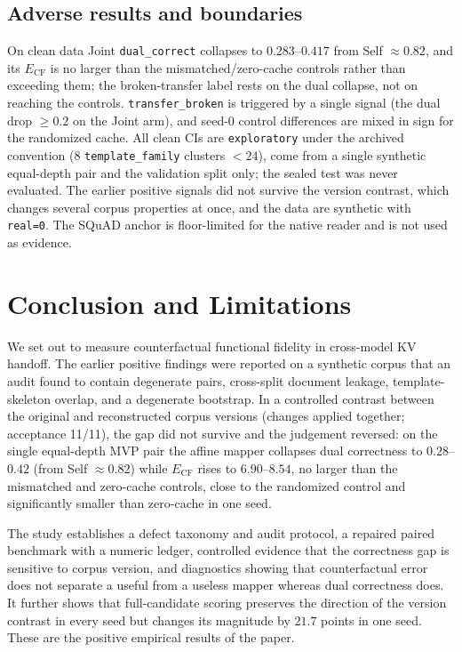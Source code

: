 \documentclass[11pt,a4paper]{article}
\begin{document}
\subsection{Adverse results and boundaries}
\label{sec:adverse}

On clean data Joint \texttt{dual\_correct} collapses to $0.283$--$0.417$ from
Self $\approx0.82$, and its $E_{\mathrm{CF}}$ is no larger than the
mismatched/zero-cache controls rather than exceeding them; the broken-transfer
label rests on the dual collapse, not on reaching the controls.
\texttt{transfer\_broken} is triggered by a single signal (the dual drop
$\ge0.2$ on the Joint arm), and seed-0 control differences are mixed in sign
for the randomized cache. All clean CIs are \texttt{exploratory} under the
archived convention (8 \texttt{template\_family} clusters $<24$), come from a
single synthetic equal-depth pair and the validation split only; the sealed
test was never evaluated. The earlier positive signals did not survive the
version contrast, which changes several corpus properties at once, and the
data are synthetic with \texttt{real=0}. The SQuAD anchor is floor-limited for
the native reader and is not used as evidence.

\section{Conclusion and Limitations}
\label{sec:conclusion}

We set out to measure counterfactual functional fidelity in cross-model KV
handoff. The earlier positive findings were reported on a synthetic corpus that
an audit found to contain degenerate pairs, cross-split document leakage,
template-skeleton overlap, and a degenerate bootstrap. In a controlled contrast
between the original and reconstructed corpus versions (changes applied
together; acceptance 11/11), the gap did not survive and the judgement reversed:
on the single equal-depth MVP pair the affine mapper collapses dual correctness
to $0.28$--$0.42$ (from Self $\approx0.82$) while $E_{\mathrm{CF}}$ rises to
$6.90$--$8.54$, no larger than the mismatched and zero-cache controls, close to
the randomized control and significantly smaller than zero-cache in one seed.

The study establishes a defect taxonomy and audit protocol, a repaired paired
benchmark with a numeric ledger, controlled evidence that the correctness gap
is sensitive to corpus version, and diagnostics showing that counterfactual
error does not separate a useful from a useless mapper whereas dual correctness
does. It further shows that full-candidate scoring preserves the direction of
the version contrast in every seed but changes its magnitude by $21.7$ points
in one seed. These are the positive empirical results of the paper.
\end{document}
